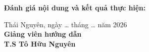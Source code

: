 \vspace{0.5cm}
\noindent\textbf{Đánh giá nội dung và kết quả thực hiện:}

\vspace{0.4cm}
\noindent\dotfill

\vspace{0.4cm}
\noindent\dotfill

\vspace{0.4cm}
\noindent\dotfill

\vspace{0.8cm}
\begin{flushright}
\begin{minipage}{0.50\textwidth}
\centering
Thái Nguyên, ngày \ldots{} tháng \ldots{} năm 2026\\[0.2cm]
\textbf{Giảng viên hướng dẫn}\\[2.0cm]
\textbf{T.S Tô Hữu Nguyên}
\end{minipage}
\end{flushright}
